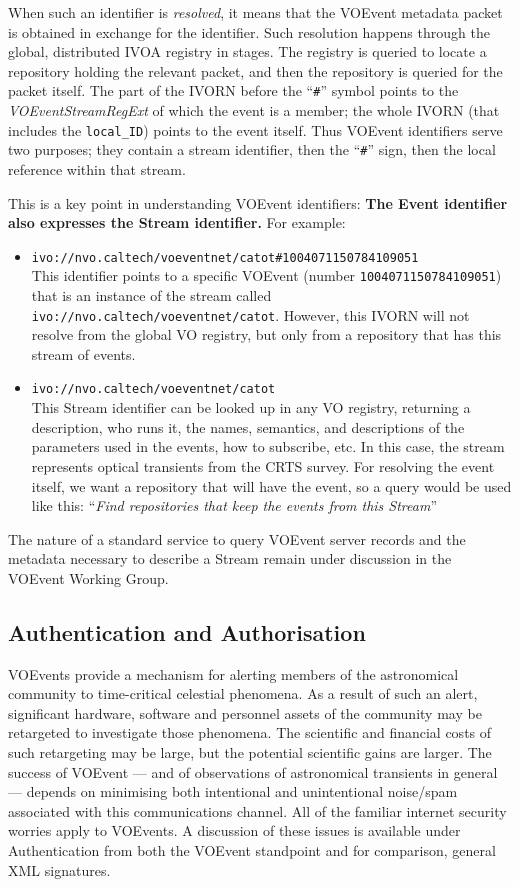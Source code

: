 \documentclass[11pt,a4paper]{ivoa}
\begin{document}
When such an identifier is \emph{resolved}, it means that the VOEvent metadata packet is obtained in exchange for the identifier. Such resolution happens through the global, distributed IVOA registry in stages. The registry is queried to locate a repository holding the relevant packet, and then the repository is queried for the packet itself. The part of the IVORN before the ``{\tt\#}'' symbol points to the \emph{VOEventStreamRegExt} of which the event is a member; the whole IVORN (that includes the {\tt local\_ID}) points to the event itself. Thus VOEvent identifiers serve two purposes; they contain a stream identifier, then the ``{\tt\#}'' sign, then the local reference within that stream. 

This is a key point in understanding VOEvent identifiers: {\bf The Event identifier also expresses the Stream identifier.} For example: 
\begin{itemize}
\item {\tt ivo://nvo.caltech/voeventnet/catot\#1004071150784109051}\\
This identifier points to a specific VOEvent (number {\tt 1004071150784109051}) that is an instance of the stream called {\tt ivo://nvo.caltech/voeventnet/catot}. However, this IVORN will not resolve from the global VO registry, but only from a repository that has this stream of events. 
\item {\tt ivo://nvo.caltech/voeventnet/catot}\\
This Stream identifier can be looked up in any VO registry, returning a description, who runs it, the names, semantics, and descriptions of the parameters used in the events, how to subscribe, etc. In this case, the stream represents optical transients from the CRTS survey. For resolving the event itself, we want a repository that will have the event, so a query would be used like this: ``\emph{Find repositories that keep the events from this Stream}'' 
\end{itemize}

The nature of a standard service to query VOEvent server records and the metadata necessary to describe a Stream remain under discussion in the VOEvent Working Group. 

\subsection{Authentication and Authorisation}
\label{sec:2.3}
VOEvents provide a mechanism for alerting members of the astronomical community to time-critical celestial phenomena. As a result of such an alert, significant hardware, software and personnel assets of the community may be retargeted to investigate those phenomena. The scientific and financial costs of such retargeting may be large, but the potential scientific gains are larger. The success of VOEvent --- and of observations of astronomical transients in general --- depends on minimising both intentional and unintentional noise/spam associated with this communications channel. All of the familiar internet security worries apply to VOEvents. A discussion of these issues is available under Authentication \citep{bib34} from both the VOEvent standpoint and for comparison, general XML signatures. 
\end{document}
